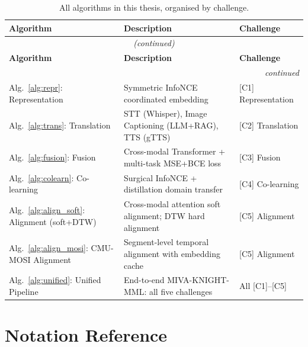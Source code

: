 \documentclass[12pt,a4paper]{article}
\theoremstyle{definition}
\theoremstyle{plain}
\theoremstyle{remark}
\begin{document}
\begin{longtable}{p{5.0cm}p{7.5cm}p{2.5cm}}
\caption{All algorithms in this thesis, organised by challenge.}\label{tab:algo_ref}\\
\toprule
\textbf{Algorithm} & \textbf{Description} & \textbf{Challenge} \\
\midrule
\endfirsthead
\multicolumn{3}{c}{\textit{(continued)}}\\
\toprule \textbf{Algorithm} & \textbf{Description} & \textbf{Challenge} \\ \midrule
\endhead \midrule \multicolumn{3}{r}{\textit{continued}}\\ \endfoot \bottomrule \endlastfoot

Alg.~\ref{alg:repr}: Representation & Symmetric InfoNCE coordinated embedding & [C1] Representation \\[3pt]
Alg.~\ref{alg:trans}: Translation & STT (Whisper), Image Captioning (LLM+RAG), TTS (gTTS) & [C2] Translation \\[3pt]
Alg.~\ref{alg:fusion}: Fusion & Cross-modal Transformer + multi-task MSE+BCE loss & [C3] Fusion \\[3pt]
Alg.~\ref{alg:colearn}: Co-learning & Surgical InfoNCE + distillation domain transfer & [C4] Co-learning \\[3pt]
Alg.~\ref{alg:align_soft}: Alignment (soft+DTW) & Cross-modal attention soft alignment; DTW hard alignment & [C5] Alignment \\[3pt]
Alg.~\ref{alg:align_mosi}: CMU-MOSI Alignment & Segment-level temporal alignment with embedding cache & [C5] Alignment \\[3pt]
Alg.~\ref{alg:unified}: Unified Pipeline & End-to-end MIVA-KNIGHT-MML: all five challenges & All [C1]--[C5] \\[3pt]
\end{longtable}

\section{Notation Reference}
\end{document}
